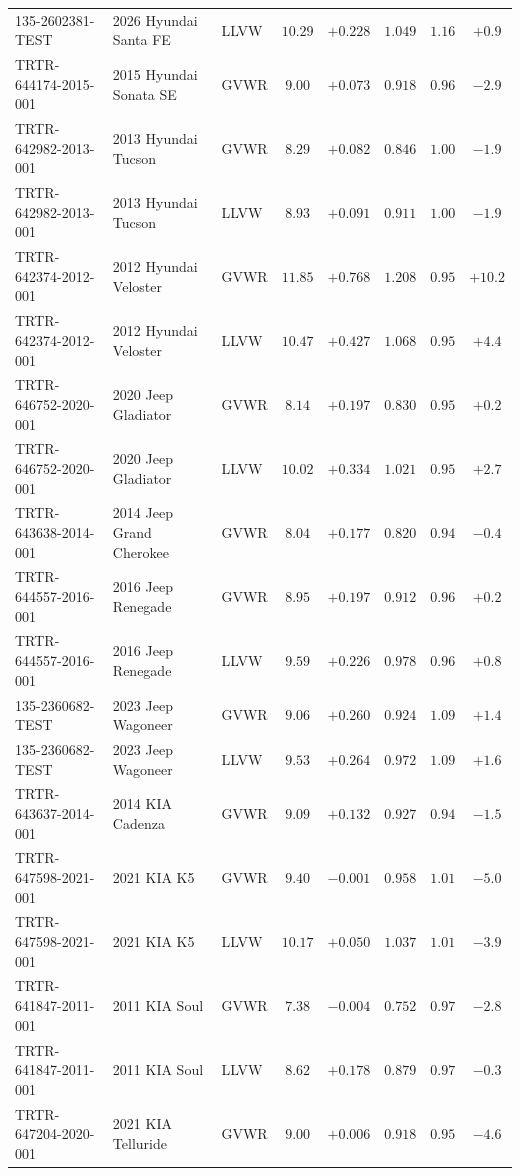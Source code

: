 \documentclass[12pt, twoside]{amsart}
\theoremstyle{definition}
\begin{document}
{\begin{longtable}{lp{2.9cm}lccccc}
135-2602381-TEST & 2026 Hyundai Santa FE & LLVW & $10.29$ & $+0.228$ & $1.049$ & $1.16$ & $+0.9$\\
TRTR-644174-2015-001 & 2015 Hyundai Sonata SE & GVWR & $9.00$ & $+0.073$ & $0.918$ & $0.96$ & $-2.9$\\
TRTR-642982-2013-001 & 2013 Hyundai Tucson & GVWR & $8.29$ & $+0.082$ & $0.846$ & $1.00$ & $-1.9$\\
TRTR-642982-2013-001 & 2013 Hyundai Tucson & LLVW & $8.93$ & $+0.091$ & $0.911$ & $1.00$ & $-1.9$\\
TRTR-642374-2012-001 & 2012 Hyundai Veloster & GVWR & $11.85$ & $+0.768$ & $1.208$ & $0.95$ & $+10.2$\\
TRTR-642374-2012-001 & 2012 Hyundai Veloster & LLVW & $10.47$ & $+0.427$ & $1.068$ & $0.95$ & $+4.4$\\
TRTR-646752-2020-001 & 2020 Jeep Gladiator & GVWR & $8.14$ & $+0.197$ & $0.830$ & $0.95$ & $+0.2$\\
TRTR-646752-2020-001 & 2020 Jeep Gladiator & LLVW & $10.02$ & $+0.334$ & $1.021$ & $0.95$ & $+2.7$\\
TRTR-643638-2014-001 & 2014 Jeep Grand Cherokee & GVWR & $8.04$ & $+0.177$ & $0.820$ & $0.94$ & $-0.4$\\
TRTR-644557-2016-001 & 2016 Jeep Renegade & GVWR & $8.95$ & $+0.197$ & $0.912$ & $0.96$ & $+0.2$\\
TRTR-644557-2016-001 & 2016 Jeep Renegade & LLVW & $9.59$ & $+0.226$ & $0.978$ & $0.96$ & $+0.8$\\
135-2360682-TEST & 2023 Jeep Wagoneer & GVWR & $9.06$ & $+0.260$ & $0.924$ & $1.09$ & $+1.4$\\
135-2360682-TEST & 2023 Jeep Wagoneer & LLVW & $9.53$ & $+0.264$ & $0.972$ & $1.09$ & $+1.6$\\
TRTR-643637-2014-001 & 2014 KIA Cadenza & GVWR & $9.09$ & $+0.132$ & $0.927$ & $0.94$ & $-1.5$\\
TRTR-647598-2021-001 & 2021 KIA K5 & GVWR & $9.40$ & $-0.001$ & $0.958$ & $1.01$ & $-5.0$\\
TRTR-647598-2021-001 & 2021 KIA K5 & LLVW & $10.17$ & $+0.050$ & $1.037$ & $1.01$ & $-3.9$\\
TRTR-641847-2011-001 & 2011 KIA Soul & GVWR & $7.38$ & $-0.004$ & $0.752$ & $0.97$ & $-2.8$\\
TRTR-641847-2011-001 & 2011 KIA Soul & LLVW & $8.62$ & $+0.178$ & $0.879$ & $0.97$ & $-0.3$\\
TRTR-647204-2020-001 & 2021 KIA Telluride & GVWR & $9.00$ & $+0.006$ & $0.918$ & $0.95$ & $-4.6$\\

\end{longtable}}
\end{document}
